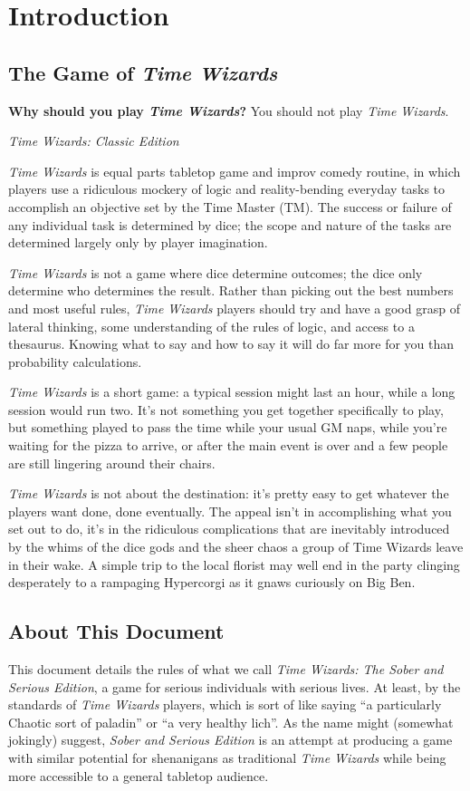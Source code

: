\documentclass[twoside]{article}
\newcommand{\twsse}{\emph{Time Wizards: The Sober and Serious Edition}}
\newcommand{\tw}{\emph{Time Wizards}}
\newcommand{\sse}{\emph{Sober and Serious Edition}}
\begin{document}

\pagestyle{empty}
\cleardoublepage

\setcounter{tocdepth}{2}
\tableofcontents
\cleardoublepage

\pagestyle{plain}
\setcounter{page}{1}

\section{Introduction} \label{sec:intro}
\subsection{The Game of \tw{}} \label{ssec:gameintro}
\epigraph{\textbf{Why should you play \tw{}?} You should not play \tw{}.}
   {\emph{Time Wizards: Classic Edition}}
\tw{} is equal parts tabletop game and improv comedy routine, in which players use a ridiculous
mockery of logic and reality-bending everyday tasks to accomplish an objective set by the Time
Master (TM). The success or failure of any individual task is determined by dice; the scope and
nature of the tasks are determined largely only by player imagination.

\tw{} is not a game where dice determine outcomes; the dice only determine who determines the
result. Rather than picking out the best numbers and most useful rules, \tw{} players should
try and have a good grasp of lateral thinking, some understanding of the rules of logic, and
access to a thesaurus. Knowing what to say and how to say it will do far more for you than
probability calculations.

\tw{} is a short game: a typical session might last an hour, while a long session would run two.
It's not something you get together specifically to play, but something played to pass the time
while your usual GM naps, while you're waiting for the pizza to arrive, or after the main event
is over and a few people are still lingering around their chairs.

\tw{} is not about the destination: it's pretty easy to get whatever the players want done, done
eventually. The appeal isn't in accomplishing what you set out to do, it's in the ridiculous
complications that are inevitably introduced by the whims of the dice gods and the sheer chaos
a group of Time Wizards leave in their wake. A simple trip to the local florist may well end in
the party clinging desperately to a rampaging Hypercorgi as it gnaws curiously on Big Ben.

\subsection{About This Document} \label{ssec:rulesintro}
This document details the rules of what we call \twsse{}, a game for serious individuals
with serious lives. At least, by the standards of \tw{} players, which is sort of like saying
``a particularly Chaotic sort of paladin'' or ``a very healthy lich''. As the name might 
(somewhat jokingly) suggest, \sse{} is an attempt at producing a game with similar potential for
shenanigans as traditional \tw{} while being more accessible to a general tabletop audience.
\end{document}
